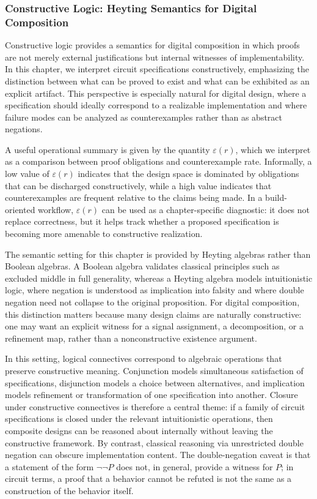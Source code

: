 \documentclass[11pt]{article}
\begin{document}
\subsubsection{Constructive Logic: Heyting Semantics for Digital Composition}

Constructive logic provides a semantics for digital composition in which proofs are not merely external justifications but internal witnesses of implementability. In this chapter, we interpret circuit specifications constructively, emphasizing the distinction between what can be proved to exist and what can be exhibited as an explicit artifact. This perspective is especially natural for digital design, where a specification should ideally correspond to a realizable implementation and where failure modes can be analyzed as counterexamples rather than as abstract negations.

A useful operational summary is given by the quantity \(\varepsilon(r)\), which we interpret as a comparison between proof obligations and counterexample rate. Informally, a low value of \(\varepsilon(r)\) indicates that the design space is dominated by obligations that can be discharged constructively, while a high value indicates that counterexamples are frequent relative to the claims being made. In a build-oriented workflow, \(\varepsilon(r)\) can be used as a chapter-specific diagnostic: it does not replace correctness, but it helps track whether a proposed specification is becoming more amenable to constructive realization.

The semantic setting for this chapter is provided by Heyting algebras rather than Boolean algebras. A Boolean algebra validates classical principles such as excluded middle in full generality, whereas a Heyting algebra models intuitionistic logic, where negation is understood as implication into falsity and where double negation need not collapse to the original proposition. For digital composition, this distinction matters because many design claims are naturally constructive: one may want an explicit witness for a signal assignment, a decomposition, or a refinement map, rather than a nonconstructive existence argument.

In this setting, logical connectives correspond to algebraic operations that preserve constructive meaning. Conjunction models simultaneous satisfaction of specifications, disjunction models a choice between alternatives, and implication models refinement or transformation of one specification into another. Closure under constructive connectives is therefore a central theme: if a family of circuit specifications is closed under the relevant intuitionistic operations, then composite designs can be reasoned about internally without leaving the constructive framework. By contrast, classical reasoning via unrestricted double negation can obscure implementation content. The double-negation caveat is that a statement of the form \(\neg\neg P\) does not, in general, provide a witness for \(P\); in circuit terms, a proof that a behavior cannot be refuted is not the same as a construction of the behavior itself.
\end{document}
